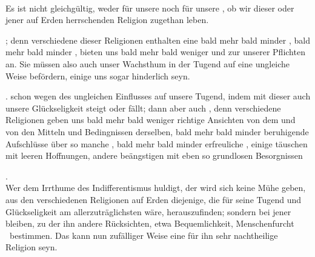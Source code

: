 \begin{aufza}\par
\item {}\\
Es ist nicht gleichgültig, weder für unsere  noch für unsere , ob wir dieser oder jener auf Erden herrschenden Religion zugethan leben.
\begin{aufzb}
\item {}; denn verschiedene dieser Religionen enthalten eine bald mehr bald minder , bald mehr bald minder , bieten uns bald mehr bald weniger  und  zur  unserer Pflichten an. Sie müssen also auch unser Wachsthum in der Tugend auf eine ungleiche Weise befördern, einige uns sogar hinderlich seyn.
\item {}.  schon wegen des ungleichen Einflusses auf unsere Tugend, indem mit dieser auch unsere Glückseligkeit steigt oder fällt; dann aber auch , denn verschiedene Religionen geben uns bald mehr bald weniger richtige Ansichten von dem  und von den Mitteln und Bedingnissen derselben, bald mehr bald minder beruhigende Aufschlüsse über so manche , bald mehr bald minder erfreuliche , einige täuschen mit leeren Hoffnungen, andere beängstigen mit eben so grundlosen Besorgnissen \usw 
\end{aufzb}
\item {}.\\
Wer dem Irrthume des Indifferentismus huldigt, der wird sich keine Mühe geben, aus den verschiedenen Religionen auf Erden diejenige, die für seine Tugend und Glückseligkeit am allerzuträglichsten wäre, herauszufinden; sondern bei jener bleiben, zu der ihn andere Rücksichten, etwa Bequemlichkeit, Menschenfurcht \udgl\ bestimmen. Das kann nun zufälliger Weise eine für ihn sehr nachtheilige Religion seyn.~
\end{aufza}


